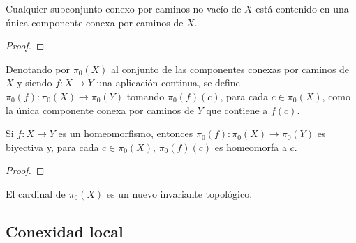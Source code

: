\begin{corolario}
    Cualquier subconjunto conexo por caminos no vacío de $X$ está contenido en una única componente conexa por caminos de $X$.
\end{corolario}
\begin{proof}
\end{proof}
\begin{definición}[Función $\pi_0$]
    Denotando por $\pi_0(X)$ al conjunto de las componentes conexas por caminos de $X$ y siendo $f \colon X \to Y$ una aplicación continua, se define $\pi_0(f) \colon \pi_0(X) \to \pi_0(Y)$ tomando $\pi_0(f)(c)$, para cada $c \in \pi_0(X)$, como la única componente conexa por caminos de $Y$ que contiene a $f(c)$.
\end{definición}
\begin{proposición}
    Si $f \colon X \to Y$ es un homeomorfismo, entonces $\pi_0(f) \colon \pi_0(X) \to \pi_0(Y)$ es biyectiva y, para cada $c \in \pi_0(X)$, $\pi_0(f)(c)$ es homeomorfa a $c$.
\end{proposición}
\begin{proof}
\end{proof}
\begin{observación}
    El cardinal de $\pi_0(X)$ es un nuevo invariante topológico.
\end{observación}

\subsection{Conexidad local}

